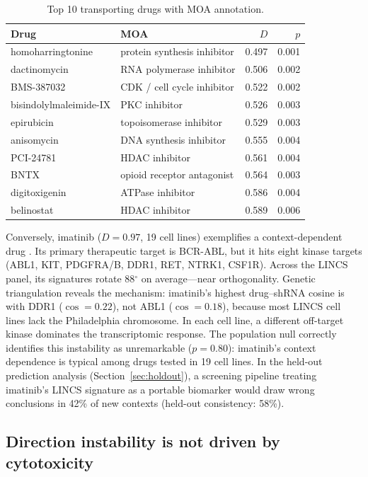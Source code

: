 \documentclass{article}
\begin{document}
\begin{table}[t]
\centering
\caption{Top 10 transporting drugs with MOA annotation.}
\label{tab:top}
\small
\begin{tabular}{llrr}
\toprule
Drug & MOA & $D$ & $p$ \\
\midrule
homoharringtonine & protein synthesis inhibitor & 0.497 & 0.001 \\
dactinomycin & RNA polymerase inhibitor & 0.506 & 0.002 \\
BMS-387032 & CDK / cell cycle inhibitor & 0.522 & 0.002 \\
bisindolylmaleimide-IX & PKC inhibitor & 0.526 & 0.003 \\
epirubicin & topoisomerase inhibitor & 0.529 & 0.003 \\
anisomycin & DNA synthesis inhibitor & 0.555 & 0.004 \\
PCI-24781 & HDAC inhibitor & 0.561 & 0.004 \\
BNTX & opioid receptor antagonist & 0.564 & 0.003 \\
digitoxigenin & ATPase inhibitor & 0.586 & 0.004 \\
belinostat & HDAC inhibitor & 0.589 & 0.006 \\
\bottomrule
\end{tabular}
\end{table}

Conversely, imatinib ($D = 0.97$, 19 cell lines) exemplifies a
context-dependent drug \citep{deininger2005imatinib}. Its primary
therapeutic target is BCR-ABL, but it hits eight kinase targets (ABL1,
KIT, PDGFRA/B, DDR1, RET, NTRK1, CSF1R). Across the LINCS panel, its signatures rotate 88$^\circ$ on
average---near orthogonality. Genetic triangulation reveals the
mechanism: imatinib's highest drug--shRNA cosine is with DDR1
($\cos = 0.22$), not ABL1 ($\cos = 0.18$), because most LINCS cell
lines lack the Philadelphia chromosome. In each cell line, a different
off-target kinase dominates the transcriptomic response. The population
null correctly identifies this instability as unremarkable ($p = 0.80$):
imatinib's context dependence is typical among drugs tested in 19 cell
lines. In the held-out prediction analysis (Section~\ref{sec:holdout}),
a screening pipeline treating imatinib's LINCS signature as a portable
biomarker would draw wrong conclusions in 42\% of new contexts
(held-out consistency: 58\%).

\subsection{Direction instability is not driven by cytotoxicity}
\end{document}
